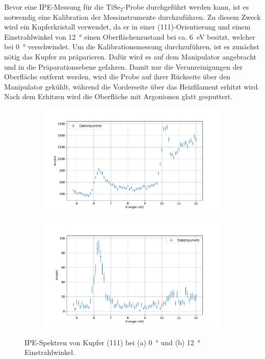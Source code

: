 Bevor eine IPE-Messung für die $\text{TiSe}_2$-Probe durchgeführt werden kann, ist es notwendig eine Kalibration der Messinstrumente durchzuführen.
Zu diesem Zweck wird ein Kupferkristall verwendet, da er in einer (111)-Orientierung und einem Einstrahlwinkel von \SI{12}{\degree} einen Oberflächenzustand bei ca. \SI{6}{\electronvolt} besitzt, welcher bei \SI{0}{\degree} verschwindet.
Um die Kalibrationsmessung durchzuführen, ist es zunächst nötig das Kupfer zu präparieren.
Dafür wird es auf dem Manipulator angebracht und in die Präparationsebene gefahren.
Damit nur die Verunreinigungen der Oberfläche entfernt werden, wird die Probe auf ihrer Rückseite über den Manipulator gekühlt, während die Vorderseite über das Heizfilament erhitzt wird.
Nach dem Erhitzen wird die Oberfläche mit Argonionen glatt gesputtert.

\begin{figure}[!ht]
    \centering
    \begin{subfigure}{0.495\textwidth}
        \centering
        \includegraphics[width=1.1\textwidth]{plots/Cu_0.pdf}
    \caption{}
    \end{subfigure}
    \begin{subfigure}{0.495\textwidth}
        \centering
        \includegraphics[width=1.1\textwidth]{plots/Cu_12.pdf}
        \caption{}
    \end{subfigure}
    \caption{IPE-Spektren von Kupfer (111) bei (a) \SI{0}{\degree} und (b) \SI{12}{\degree} Einstrahlwinkel.}
    \label{fig_Cu_kal}
\end{figure}
